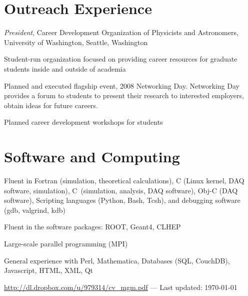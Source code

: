 \documentclass[11pt, a4paper]{article}
\newcommand{\virginyears}[1]{\marginpar{\scriptsize #1}}
\newcommand{\years}[1]{\noindent\virginyears{#1}}
\newcommand{\cpp}{C\protect\raisebox{.25ex}{++}\ }
\newenvironment{packed_enum}{
\begin{itemize}[topsep=0pt]
  \renewcommand{\labelitemi}{$\cdot$}
  \setlength{\itemsep}{1pt}
  \setlength{\parskip}{0pt}
  \setlength{\parsep}{0pt}
}{\end{itemize}}
\begin{document}
\section*{Outreach Experience}
\years{2008-2009}\emph{President}, Career Development Organization of Physicists and Astronomers, University of Washington, Seattle, Washington
\begin{packed_enum}
\item Student-run organization focused on providing career resources for graduate students inside and outside of academia  
\item Planned and executed flagship event, 2008 Networking Day.  Networking Day provides a forum to students to present their research to interested employers, obtain ideas for future careers.
\item Planned career development workshops for students
\end{packed_enum}

\section*{Software and Computing}
\begin{packed_enum}
\item Fluent in Fortran (simulation, theoretical calculations), C (Linux kernel, DAQ software, simulation), \cpp (simulation, analysis, DAQ software), Obj-C (DAQ software), Scripting languages (Python, Bash, Tcsh), and debugging software (gdb, valgrind, kdb)
\item Fluent in the software packages: ROOT, Geant4, CLHEP
\item Large-scale parallel programming (MPI)
\item General experience with Perl, Math\-ematica, Databases (SQL, CouchDB), Ja\-va\-script, HTML, XML, Qt
\end{packed_enum}
\vfill{}
\hrulefill

\begin{center}
{\footnotesize \href{http://dl.dropbox.com/u/979314/cv_mgm.pdf}{http://dl.dropbox.com/u/979314/cv\_mgm.pdf} — Last updated: \usvardate\today
}
\end{center}
\end{document}
